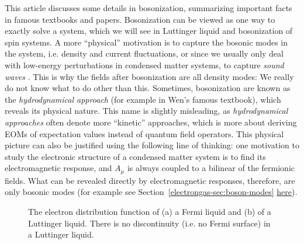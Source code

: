 \documentclass[hyperref, a4paper]{article}
\begin{document}
This article discusses some details in bosonization, summarizing important facts in famous textbooks and papers.
Bosonization can be viewed as one way to exactly solve a system, which we will see in Luttinger liquid and
bosonization of spin systems. A more ``physical'' motivation is to capture the bosonic modes in the system,
i.e. density and current fluctuations, or since we usually only deal with low-energy perturbations in 
condensed matter systems, to capture \emph{sound waves} \cite{Tomonaga1950RemarksOB,10.1143/PTPS.170.185}. 
This is why the fields after bosonization are all density modes: We really do not know what to do other than
this. Sometimes, bosonization are known as the \emph{hydrodynamical approach} (for example in Wen's famous 
textbook), which reveals its physical nature. This name is slightly misleading, as \emph{hydrodynamical approaches}
often denote more ``kinetic'' approaches, which is more about deriving EOMs of expectation values instead of 
quantum field operators. This physical picture can also be justified using the following line of thinking: 
one motivation to study the electronic structure of a condensed matter system is to find its electromagnetic 
response, and $A_\mu$ is always coupled to a bilinear of the fermionic fields. What can be revealed directly 
by electromagnetic responses, therefore, are only bosonic modes (for example see Section~\ref{electrongas-sec:boson-modes} \href{../band-metal-insulator/electron-gas.pdf}{here}).

\begin{figure}
    \centering
    
    \caption{The electron distribution function of (a) a Fermi liquid and (b) of a Luttinger liquid. There is no discontinuity (i.e. no Fermi surface) in a Luttinger liquid.}
    \label{fig:distribution}
\end{figure}
\end{document}
